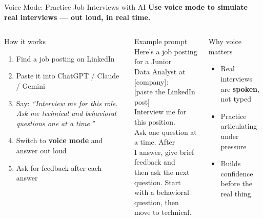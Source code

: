 \documentclass[aspectratio=169]{beamer}
\begin{document}
\begin{frame}{Voice Mode: Practice Job Interviews with AI}
\small
\textbf{\color{popblue}Use voice mode to simulate real interviews --- out loud, in real time.}

\smallskip
\begin{columns}[T]
\begin{block}{How it works}
\begin{enumerate}\setlength\itemsep{0em}
  \item Find a job posting on LinkedIn
  \item Paste it into ChatGPT / Claude / Gemini
  \item Say: \textit{``Interview me for this role. Ask me technical and behavioral questions one at a time.''}
  \item Switch to \textbf{voice mode} and answer out loud
  \item Ask for feedback after each answer
\end{enumerate}
\end{block}

\begin{block}{Example prompt}
\ttfamily\scriptsize
Here's a job posting for a Junior\\
Data Analyst at [company]:\\[2pt]
[paste the LinkedIn post]\\[2pt]
Interview me for this position.\\
Ask one question at a time. After\\
I answer, give brief feedback and\\
then ask the next question. Start\\
with a behavioral question, then\\
move to technical.
\end{block}

\smallskip
\begin{exampleblock}{Why voice matters}
\begin{itemize}\setlength\itemsep{0em}
  \item Real interviews are \textbf{spoken}, not typed
  \item Practice articulating under pressure
  \item Builds confidence before the real thing
\end{itemize}
\end{exampleblock}
\end{columns}
\end{frame}
\end{document}
